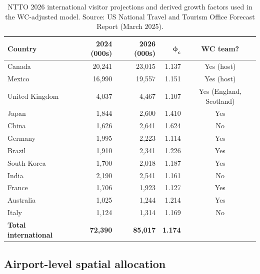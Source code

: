 \documentclass[12pt]{article}
\begin{document}
\begin{table}[h!]
\centering
\caption{NTTO 2026 international visitor projections and derived
  growth factors used in the WC-adjusted model. Source:
  US National Travel and Tourism Office Forecast Report
  (March 2025).}
\label{tab:ntto}
\small
\begin{tabular}{lrrrc}
\toprule
\textbf{Country} & \textbf{2024 (000s)} & \textbf{2026 (000s)}
  & $\boldsymbol{\phi_c}$ & \textbf{WC team?} \\
\midrule
Canada         & 20,241 & 23,015 & 1.137 & Yes (host) \\
Mexico         & 16,990 & 19,557 & 1.151 & Yes (host) \\
United Kingdom & 4,037  & 4,467  & 1.107 & Yes (England, Scotland) \\
Japan          & 1,844  & 2,600  & 1.410 & Yes \\
China          & 1,626  & 2,641  & 1.624 & No \\
Germany        & 1,995  & 2,223  & 1.114 & Yes \\
Brazil         & 1,910  & 2,341  & 1.226 & Yes \\
South Korea    & 1,700  & 2,018  & 1.187 & Yes \\
India          & 2,190  & 2,541  & 1.161 & No \\
France         & 1,706  & 1,923  & 1.127 & Yes \\
Australia      & 1,025  & 1,244  & 1.214 & Yes \\
Italy          & 1,124  & 1,314  & 1.169 & No \\
\midrule
\textbf{Total international} & \textbf{72,390} & \textbf{85,017}
  & \textbf{1.174} & \\
\bottomrule
\end{tabular}
\end{table}

\subsection*{Airport-level spatial allocation}
\end{document}

